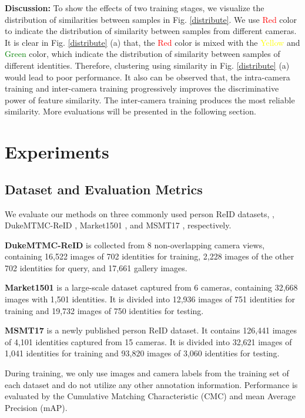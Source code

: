 \documentclass[final]{cvpr}
\begin{document}
\textbf{Discussion:} To show the effects of two training stages, we visualize the distribution of similarities between samples in Fig. \ref{distribute}. We use \textcolor{red}{Red} color to indicate the distribution of similarity between samples from different cameras. It is clear in Fig. \ref{distribute} (a) that, the \textcolor{red}{Red} color is mixed with the \textcolor{yellow}{Yellow} and \textcolor{green}{Green} color, which indicate the distribution of similarity between samples of different identities. Therefore, clustering using similarity in Fig. \ref{distribute} (a) would lead to poor performance. It also can be observed that, the intra-camera training and inter-camera training progressively improves the discriminative power of feature similarity. The inter-camera training produces the most reliable similarity. More evaluations will be presented in the following section.


\section{Experiments}
\subsection{Dataset and Evaluation Metrics}
We evaluate our methods on three commonly used person ReID datasets, \eg, DukeMTMC-ReID \cite{dukemtmc}, Market1501 \cite{market1501}, and MSMT17 \cite{PTGan}, respectively.

\textbf{DukeMTMC-ReID} is collected from 8 non-overlapping camera views, containing 16,522 images of 702 identities for training, 2,228 images of the other 702 identities for query, and 17,661 gallery images.

\textbf{Market1501} is a large-scale dataset captured from 6 cameras, containing 32,668 images with 1,501 identities. It is divided into 12,936 images of 751 identities for training and 19,732 images of 750 identities for testing.

\textbf{MSMT17} is a newly published person ReID dataset. It contains 126,441 images of 4,101 identities captured from 15 cameras. It is divided into 32,621 images of 1,041 identities for training and 93,820 images of 3,060 identities for testing.

During training, we only use images and camera labels from the training set of each dataset and do not utilize any other annotation information. Performance is evaluated by the Cumulative Matching Characteristic (CMC) and mean Average Precision (mAP).
\end{document}
